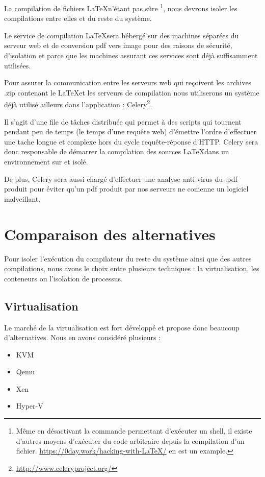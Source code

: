 \documentclass[10pt,a4paper]{article}
\begin{document}
La compilation de fichiers \LaTeX n'étant pas sûre \footnote{Même en désactivant la commande permettant d'exécuter un shell, il existe d'autres moyens d'exécuter du code arbitraire depuis la compilation d'un fichier.  \url{https://0day.work/hacking-with-LaTeX/} en est un example.}, nous devrons isoler les compilations entre elles et du reste du système.

Le service de compilation \LaTeX sera hébergé sur des machines séparées du serveur web et de conversion pdf vers image pour des raisons de sécurité, d'isolation et parce que les machines assurant ces services sont déjà suffisamment utilisées.

Pour assurer la communication entre les serveurs web qui reçoivent les archives .zip contenant le \LaTeX et les serveurs de compilation nous utiliserons un système déjà utilisé ailleurs dans l'application :
Celery\footnote{\url{http://www.celeryproject.org/}}.

Il s'agit d'une file de tâches distribuée qui permet à des scripts qui tournent pendant peu de temps (le temps d'une requête web) d'émettre l'ordre d'effectuer une tache longue et complexe hors du cycle requête-réponse d'HTTP.
Celery sera donc responsable de démarrer la compilation des sources \LaTeX dans un environnement sur et isolé.

De plus, Celery sera aussi chargé d'effectuer une analyse anti-virus du .pdf produit pour éviter qu'un pdf produit par nos serveurs ne conienne un logiciel malveillant.

\section{Comparaison des alternatives}
Pour isoler l'exécution du compilateur du reste du système ainsi que des autres compilations, nous avons le choix entre plusieurs techniques : la virtualisation, les conteneurs ou l'isolation de processus.

\subsection{Virtualisation}

Le marché de la virtualisation est fort développé et propose donc beaucoup d'alternatives. Nous en avons considéré plusieurs :

\begin{itemize}
    \item{KVM}
    \item{Qemu}
    \item{Xen}
    \item{Hyper-V}
\end{itemize}
\end{document}
